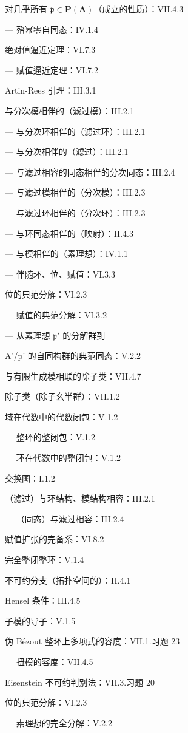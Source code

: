 对几乎所有 \(\mathfrak{p} \in \mathbf{P}(\mathbf{A})\)（成立的性质）：VII.4.3

--- 殆幂零自同态：IV.1.4

绝对值逼近定理：VI.7.3

--- 赋值逼近定理：VI.7.2

Artin-Rees 引理：III.3.1

与分次模相伴的（滤过模）：III.2.1

--- 与分次环相伴的（滤过环）：III.2.1

--- 与分次相伴的（滤过）：III.2.1

--- 与滤过相容的同态相伴的分次同态：III.2.4

--- 与滤过模相伴的（分次模）：III.2.3

--- 与滤过环相伴的（分次环）：III.2.3

--- 与环同态相伴的（映射）：II.4.3

--- 与模相伴的（素理想）：IV.1.1

--- 伴随环、位、赋值：VI.3.3

位的典范分解：VI.2.3

--- 赋值的典范分解：VI.3.2

--- 从素理想 \(\mathfrak{p}'\) 的分解群到

A'/p' 的自同构群的典范同态：V.2.2

与有限生成模相联的除子类：VII.4.7

除子类（除子幺半群）：VII.1.2

域在代数中的代数闭包：V.1.2

--- 整环的整闭包：V.1.2

--- 环在代数中的整闭包：V.1.2

交换图：I.1.2

（滤过）与环结构、模结构相容：III.2.1

--- （同态）与滤过相容：III.2.4

赋值扩张的完备系：VI.8.2

完全整闭整环：V.1.4

不可约分支（拓扑空间的）：II.4.1

Hensel 条件：III.4.5

子模的导子：V.1.5

伪 Bézout 整环上多项式的容度：VII.1.习题 23

--- 扭模的容度：VII.4.5

Eisenstein 不可约判别法：VII.3.习题 20

位的典范分解：VI.2.3

--- 素理想的完全分解：V.2.2

